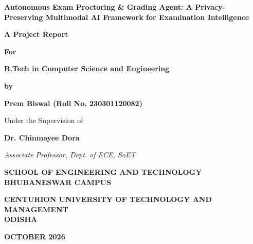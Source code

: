 \documentclass{article}
\begin{document}
\renewcommand{\thepage}{\roman{page}}

\begin{titlepage}
\begin{center}
    \vspace*{0.5cm}

    {{\LARGE \textbf{Autonomous Exam Proctoring \& Grading Agent: A Privacy-Preserving Multimodal AI Framework for Examination Intelligence}}\par}

    \vspace{1cm}
    {\Large \bf A Project Report\par}
    {\Large \bf For\par}
    {\Large \bf B.Tech in Computer Science and Engineering\par}
    \vspace{0.5cm}

    {\large \bf by\par}
    \vspace{0.3cm}
    {\large \textbf{{Prem Biswal (Roll No. 230301120082)}}\par}

    \vspace{0.6cm}

    {\large Under the Supervision of \par}
    {\Large \textbf{{Dr. Chinmayee Dora}}\par}
    {\large \textit{Associate Professor, Dept. of ECE, SoET}\par}
    \vspace{0.8cm}

    \vspace{0.6cm}

    {\large \textbf{SCHOOL OF ENGINEERING AND TECHNOLOGY}\\
    {\large \textbf{BHUBANESWAR CAMPUS}}}

    \vspace{0.3cm}

    {\large \textbf{CENTURION UNIVERSITY OF TECHNOLOGY AND MANAGEMENT\\ODISHA}\par}
    \vspace{0.4cm}

    {\large \textbf{OCTOBER 2026}}
\end{center}
\end{titlepage}
\newpage
\end{document}
